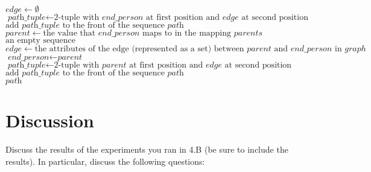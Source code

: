 \documentclass{article}
\begin{document}
    \begin{algorithm}
    \begin{algorithmic}[1]
        \State $\textit{edge} \gets \emptyset$
        \State $\textit{path\_tuple} \gets \text{2-tuple with } \textit{end\_person} \text{ at first position and } \textit{edge} \text{ at second position}$
        \State $\text{add } \textit{path\_tuple} \text{ to the front of the sequence } \textit{path}$
            \State $\textit{parent} \gets \text{the value that } \textit{end\_person} \text{ maps to in the mapping } parents$
                \Return $\text{an empty sequence}$
            \EndIf
            \State $\textit{edge} \gets \text{the attributes of the edge (represented as a set) between } \textit{parent} \text{ and } \textit{end\_person} \text{ in } graph$
            \State $\textit{end\_person} \gets \textit{parent}$
            \State $\textit{path\_tuple} \gets \text{2-tuple with } \textit{parent} \text{ at first position and } \textit{edge} \text{ at second position}$
            \State $\text{add } \textit{path\_tuple} \text{ to the front of the sequence } \textit{path}$
        \EndWhile \\
        \hspace*{4mm} \Return $\textit{path}$
        \EndProcedure
    \end{algorithmic}
    \end{algorithm}
   
\section{Discussion}

Discuss the results of the experiments you ran in 4.B (be sure to include the results). In particular, discuss the following questions:
\end{document}

